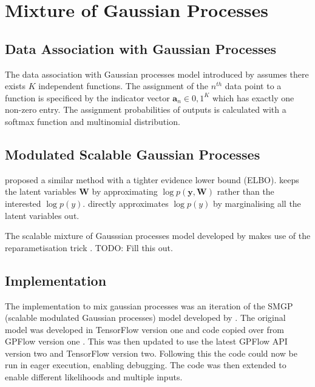 \documentclass[12pt,a4paper]{report}
\theoremstyle{definition}
\begin{document}

\section{Mixture of Gaussian Processes}

\subsection{Data Association with Gaussian Processes}

The data association with Gaussian processes model introduced by \citet{Kaiser2018} assumes there exists $K$ independent functions.
The assignment of the $n^{th}$ data point to a function is specificed by the indicator vector $\textbf{a}_{n} \in {0, 1}^K$ which has exactly one non-zero entry.
The assignment probabilities of outputs is calculated with a softmax function and multinomial distribution. 

\subsection{Modulated Scalable Gaussian Processes}

\citet{Lui2020} proposed a similar method with a tighter evidence lower bound (ELBO).
\citet{Kaiser2018} keeps the latent variables $\textbf{W}$ by approximating $\log p(\textbf{y}, \textbf{W})$ rather than the interested $\log p(y)$.
\citet{Lui2020} directly approximates $\log p(y)$ by marginalising all the latent variables out.

The scalable mixture of Gausssian processes model developed by \citet{Lui2020} makes use of the reparametisation trick \citep{Maddison2017}.
TODO: Fill this out.

\subsection{Implementation}

The implementation to mix gaussian processes was an iteration of the SMGP (scalable modulated Gaussian processes) model developed by \citet{Lui2020}.
The original model was developed in TensorFlow version one and code copied over from GPFlow version one \citep{GPflow2017}.
This was then updated to use the latest GPFlow API version two and TensorFlow version two. 
Following this the code could now be run in eager execution, enabling debugging.
The code was then extended to enable different likelihoods and multiple inputs.
\end{document}
